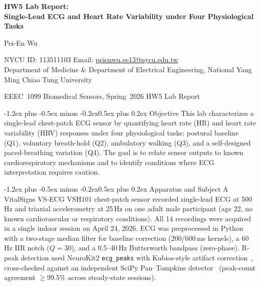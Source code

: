 \documentclass[11pt,a4paper]{article}
\makeatletter
\renewcommand\section{\@startsection{section}{1}{\z@}%
  {-1.2ex plus -0.5ex minus -0.2ex}{0.5ex plus 0.2ex}%
  {\normalfont\large\bfseries}}
\makeatother
\begin{document}
\begin{center}
  {\Large\bfseries HW5 Lab Report:\\[0.2em]
  Single-Lead ECG and Heart Rate Variability under Four Physiological Tasks\par}
  \vspace{0.6em}
  {\normalsize Pei-En Wu\par}
  \vspace{0.2em}
  {\small NYCU ID: 113511103 \quad
   Email: \href{mailto:peienwu.ee13@nycu.edu.tw}{peienwu.ee13@nycu.edu.tw}\\
   Department of Medicine \& Department of Electrical Engineering,
   National Yang Ming Chiao Tung University\par}
  \vspace{0.3em}
  {\footnotesize EEEC~1099 Biomedical Sensors, Spring~2026 \textemdash{}
   HW5 Lab Report\par}
\end{center}

\vspace{0.4em}

\section{Objective}
This lab characterizes a single-lead chest-patch ECG sensor by quantifying
heart rate (HR) and heart rate variability (HRV) responses under four
physiological tasks: postural baseline (Q1), voluntary breath-hold (Q2),
ambulatory walking (Q3), and a self-designed paced-breathing variation
(Q4). The goal is to relate sensor outputs to known cardiorespiratory
mechanisms and to identify conditions where ECG interpretation requires
caution.

\section{Apparatus and Subject}
A VitalSigns VS-ECG VSH101 chest-patch sensor recorded single-lead ECG at
500\,Hz and triaxial accelerometry at 25\,Hz on one adult male participant
(age 22, no known cardiovascular or respiratory conditions). All 14
recordings were acquired in a single indoor session on April 24, 2026.
ECG was preprocessed in Python with a two-stage median filter for baseline
correction (200/600\,ms kernels), a 60\,Hz IIR notch ($Q{=}30$), and a
0.5--40\,Hz Butterworth bandpass (zero-phase). R-peak detection used
NeuroKit2 \texttt{ecg\_peaks} with Kubios-style artifact
correction~\cite{makowski2021}, cross-checked against an independent
SciPy Pan--Tompkins detector~\cite{pan1985} (peak-count agreement
$\geq$99.5\% across steady-state sessions).
\end{document}
